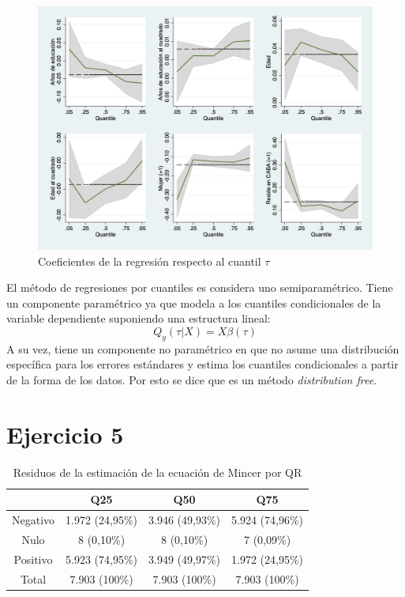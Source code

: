 \documentclass[12pt]{article}
\begin{document}
\begin{figure}[H]
	\caption{Coeficientes de la regresión respecto al cuantil $\tau$}
	\centering
	\includegraphics[width=0.8\linewidth]{4.png}
\end{figure}

El método de regresiones por cuantiles es considera uno semiparamétrico. Tiene un componente paramétrico ya que modela a los cuantiles condicionales de la variable dependiente suponiendo una estructura lineal:
\[
Q_y(\tau | X ) = X \beta(\tau)
\]
A su vez, tiene un componente no paramétrico en que no asume una distribución específica para los errores estándares y estima los cuantiles condicionales a partir de la forma de los datos. Por esto se dice que es un método \textit{distribution free}.

\section*{Ejercicio 5}

\begin{table}
    \centering
    \begin{tabular}{|c|c|c|c|}
    \hline
         & \textbf{Q25} & \textbf{Q50} & \textbf{Q75}\\ \hline
    Negativo & 1.972 (24,95\%) & 3.946 (49,93\%) & 5.924 (74,96\%) \\
    Nulo     & 8 (0,10\%) & 8 (0,10\%) & 7 (0,09\%) \\
    Positivo & 5.923 (74,95\%) & 3.949 (49,97\%) & 1.972 (24,95\%) \\ \hline
    Total    & 7.903 (100\%) & 7.903 (100\%) & 7.903 (100\%) \\ \hline
    \end{tabular}
    \caption{Residuos de la estimación de la ecuación de Mincer por QR}
    \label{tab:residuos_QR}
\end{table}
\end{document}
